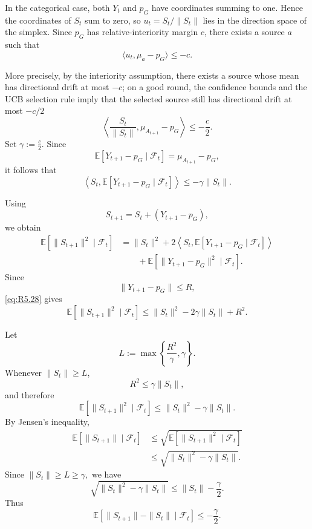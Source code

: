 \documentclass[twoside]{article}
\begin{document}
In the categorical case, both \(Y_t\) and \(p_G\) have coordinates summing to one. Hence the coordinates of \(S_t\) sum to zero, so
\(u_t=S_t/\|S_t\|\) lies in the direction space of the simplex. Since \(p_G\) has relative-interiority margin \(c\), there exists a source \(a\) such that
\[
\langle u_t,\mu_a-p_G\rangle\le -c.
\]

More precisely, by the interiority assumption, there exists a source whose mean has directional drift at most \(-c\); on a good round, the confidence bounds and the UCB selection rule imply that the selected source still has directional drift at most $-c/2$
\[
    \left\langle
        \frac{S_t}{\|S_t\|},
        \mu_{A_{t+1}}-p_G
    \right\rangle
    \le
    -\frac c2.
\]
Set $\gamma:=\frac c2.$ Since
\[
    \mathbb E[
        Y_{t+1}-p_G
        \mid\mathcal F_t
    ]
    =
    \mu_{A_{t+1}}-p_G,
\]
it follows that
\begin{equation}
    \left\langle
        S_t,
        \mathbb E[
            Y_{t+1}-p_G
            \mid\mathcal F_t
        ]
    \right\rangle
    \le
    -\gamma\|S_t\|.
    \tag{R5.28}
    \label{eq:R5.28}
\end{equation}

Using
\[
    S_{t+1}
    =
    S_t+(Y_{t+1}-p_G),
\]
we obtain
\[
\begin{aligned}
    \mathbb E[
        \|S_{t+1}\|^2
        \mid\mathcal F_t
    ]
    &=
    \|S_t\|^2
    +
    2
    \left\langle
        S_t,
        \mathbb E[
            Y_{t+1}-p_G
            \mid\mathcal F_t
        ]
    \right\rangle
    \\
    &\qquad
    +
    \mathbb E[
        \|Y_{t+1}-p_G\|^2
        \mid\mathcal F_t
    ].
\end{aligned}
\]
Since
\[
    \|Y_{t+1}-p_G\|\le R,
\]
\eqref{eq:R5.28} gives
\[
    \mathbb E[
        \|S_{t+1}\|^2
        \mid\mathcal F_t
    ]
    \le
    \|S_t\|^2
    -
    2\gamma\|S_t\|
    +
    R^2.
\]

Let
\begin{equation}
    L
    :=
    \max\left\{
        \frac{R^2}{\gamma},
        \gamma
    \right\}.
    \tag{R5.29}
    \label{eq:R5.29}
\end{equation}
Whenever \(\|S_t\|\ge L\),
\[
    R^2
    \le
    \gamma\|S_t\|,
\]
and therefore
\[
    \mathbb E[
        \|S_{t+1}\|^2
        \mid\mathcal F_t
    ]
    \le
    \|S_t\|^2-\gamma\|S_t\|.
\]
By Jensen's inequality,
\[
\begin{aligned}
    \mathbb E[
        \|S_{t+1}\|
        \mid\mathcal F_t
    ]
    &\le
    \sqrt{
        \mathbb E[
            \|S_{t+1}\|^2
            \mid\mathcal F_t
        ]
    }
    \\
    &\le
    \sqrt{
        \|S_t\|^2-\gamma\|S_t\|
    }.
\end{aligned}
\]
Since $\|S_t\|\ge L\ge\gamma,$
we have
\[
    \sqrt{
        \|S_t\|^2-\gamma\|S_t\|
    }
    \le
    \|S_t\|-\frac{\gamma}{2}.
\]
Thus
\begin{equation}
    \mathbb E\left[
        \|S_{t+1}\|-\|S_t\|
        \mid\mathcal F_t
    \right]
    \le
    -\frac{\gamma}{2}.
    \tag{R5.30}
    \label{eq:R5.30}
\end{equation}
\end{document}
